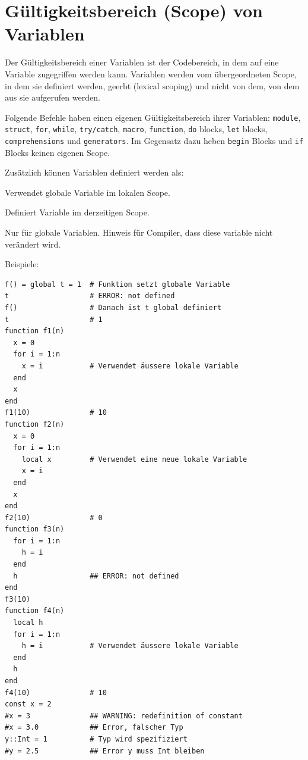\documentclass[10pt,twocolumn]{scrartcl}
\begin{document}
\section{Gültigkeitsbereich (Scope) von Variablen}
\label{sec:scopeVonVariable}

Der Gültigkeitsbereich einer Variablen ist der Codebereich, in dem auf eine
Variable zugegriffen werden kann. Variablen werden vom übergeordneten Scope, in dem sie definiert werden, geerbt (lexical scoping) und nicht von dem, von dem aus sie aufgerufen werden.

Folgende Befehle haben einen eigenen
Gültigkeitsbereich ihrer Variablen:
\lstinline|module|,
\lstinline|struct|,
\lstinline|for|,
\lstinline|while|,
\lstinline|try/catch|,
\lstinline|macro|,
\lstinline|function|,
\lstinline|do| blocks,
\lstinline|let| blocks,
\lstinline|comprehensions| und
\lstinline|generators|.
Im Gegensatz dazu heben \lstinline|begin| Blocks und \lstinline|if| Blocks
keinen eigenen Scope.

Zusätzlich können Variablen definiert werden als:
\begin{description}[style=multiline,leftmargin=1.3cm,nolistsep]
  \item[global] Verwendet globale Variable im lokalen Scope.
  \item[local] Definiert Variable im derzeitigen Scope.
  \item[const] Nur für globale Variablen. Hinweis für Compiler, dass diese
    variable nicht verändert wird.
\end{description}

Beispiele:
\begin{lstlisting}
f() = global t = 1  # Funktion setzt globale Variable
t                   # ERROR: not defined
f()                 # Danach ist t global definiert
t                   # 1
function f1(n)
  x = 0
  for i = 1:n
    x = i           # Verwendet äussere lokale Variable
  end
  x
end
f1(10)              # 10
function f2(n)
  x = 0
  for i = 1:n
    local x         # Verwendet eine neue lokale Variable
    x = i
  end
  x
end
f2(10)              # 0
function f3(n)
  for i = 1:n
    h = i
  end
  h                 ## ERROR: not defined
end
f3(10)
function f4(n)
  local h
  for i = 1:n
    h = i           # Verwendet äussere lokale Variable
  end
  h
end
f4(10)              # 10
const x = 2
#x = 3              ## WARNING: redefinition of constant
#x = 3.0            ## Error, falscher Typ
y::Int = 1          # Typ wird spezifiziert
#y = 2.5            ## Error y muss Int bleiben
\end{lstlisting}
\end{document}
